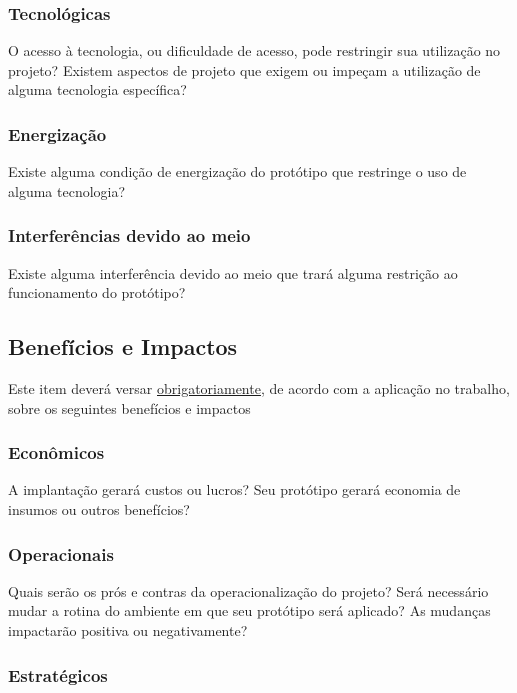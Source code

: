 \subsubsection{Tecnológicas}

O acesso à tecnologia, ou dificuldade de acesso, pode restringir sua utilização no projeto? Existem aspectos de projeto que exigem ou impeçam a utilização de alguma tecnologia específica?

\subsubsection{Energização}
Existe alguma condição de energização do protótipo que restringe o uso de alguma tecnologia? 

\subsubsection{Interferências devido ao meio}

Existe alguma interferência devido ao meio que trará alguma restrição ao funcionamento do protótipo?

\subsection{Benefícios e Impactos}

Este item deverá versar \underline{obrigatoriamente}, de acordo com a aplicação no trabalho, sobre os seguintes benefícios e impactos

\subsubsection{Econômicos}

A implantação gerará custos ou lucros? Seu protótipo gerará economia de insumos ou outros benefícios?

\subsubsection{Operacionais}

Quais serão os prós e contras da operacionalização do projeto? Será necessário mudar a rotina do ambiente em que seu protótipo será aplicado? As mudanças impactarão positiva ou negativamente?

\subsubsection{Estratégicos}

